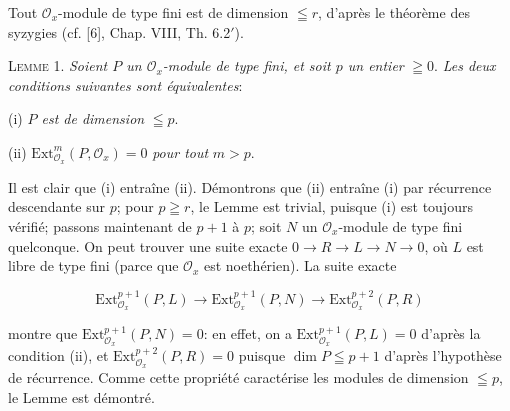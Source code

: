 %
%
%
Tout $\mathcal{O}_x$-module de type fini est de dimension $\leqq r$, d'après le théorème des syzygies (cf. [6], Chap. VIII, Th. 6.2$'$).

\textsc{Lemme} 1. \textit{Soient $P$ un $\mathcal{O}_x$-module de type fini, et soit $p$ un entier} $\geqq 0$. \textit{Les deux conditions suivantes sont équivalentes}:

(i) \textit{$P$ est de dimension} $\leqq p$.

(ii) $\mathrm{Ext}_{\mathcal{O}_x}^m(P, \mathcal{O}_x) = 0$ \textit{pour tout} $m > p$.

Il est clair que (i) entraîne (ii). Démontrons que (ii) entraîne (i) par récurrence descendante sur $p$; pour $p \geqq r$, le Lemme est trivial, puisque (i) est toujours vérifié; passons maintenant de $p + 1$ à $p$; soit $N$ un $\mathcal{O}_x$-module de type fini quelconque. On peut trouver une suite exacte $0 \rightarrow R \rightarrow L \rightarrow N \rightarrow 0$, où $L$ est libre de type fini (parce que $\mathcal{O}_x$ est noethérien). La suite exacte

\begin{equation*}
\mathrm{Ext}_{\mathcal{O}_x}^{p+1}(P, L) \rightarrow \mathrm{Ext}_{\mathcal{O}_x}^{p+1}(P, N) \rightarrow \mathrm{Ext}_{\mathcal{O}_x}^{p+2}(P, R)
\end{equation*}

montre que $\mathrm{Ext}_{\mathcal{O}_x}^{p+1}(P, N) = 0$: en effet, on a $\mathrm{Ext}_{\mathcal{O}_x}^{p+1}(P, L) = 0$ d'après la condition (ii), et $\mathrm{Ext}_{\mathcal{O}_x}^{p+2}(P, R) = 0$ puisque $\dim P \leqq p + 1$ d'après l'hypothèse de récurrence. Comme cette propriété caractérise les modules de dimension $\leqq p$, le Lemme est démontré.

